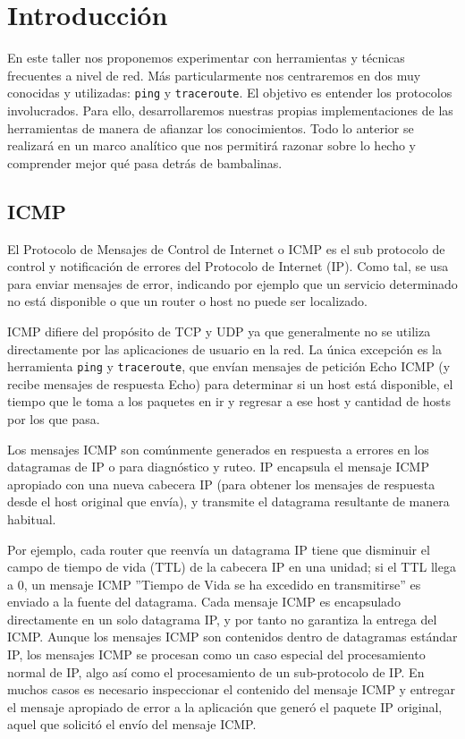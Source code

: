 \section{Introducción}

En este taller nos proponemos experimentar con herramientas y técnicas frecuentes a nivel de red. Más particularmente nos centraremos en dos muy conocidas y utilizadas: \texttt{ping} y \texttt{traceroute}. El objetivo es entender los protocolos involucrados. Para ello, desarrollaremos nuestras propias implementaciones de las herramientas de manera de afianzar los conocimientos. Todo lo anterior se realizará en un marco analítico que nos permitirá razonar sobre lo hecho y comprender mejor qué pasa detrás de bambalinas.

\subsection{ICMP}

El Protocolo de Mensajes de Control de Internet o ICMP es el sub protocolo de control y notificación de errores del Protocolo de Internet (IP). Como tal, se usa para enviar mensajes de error, indicando por ejemplo que un servicio determinado no está disponible o que un router o host no puede ser localizado.

ICMP difiere del propósito de TCP y UDP ya que generalmente no se utiliza directamente por las aplicaciones de usuario en la red. La única excepción es la herramienta \texttt{ping} y \texttt{traceroute}, que envían mensajes de petición Echo ICMP (y recibe mensajes de respuesta Echo) para determinar si un host está disponible, el tiempo que le toma a los paquetes en ir y regresar a ese host y cantidad de hosts por los que pasa.

\vspace*{5 mm}

Los mensajes ICMP son comúnmente generados en respuesta a errores en los datagramas de IP o para diagnóstico y ruteo. IP encapsula el mensaje ICMP apropiado con una nueva cabecera IP (para obtener los mensajes de respuesta desde el host original que envía), y transmite el datagrama resultante de manera habitual.

Por ejemplo, cada router que reenvía un datagrama IP tiene que disminuir el campo de tiempo de vida (TTL) de la cabecera IP en una unidad; si el TTL llega a 0, un mensaje ICMP ''Tiempo de Vida se ha excedido en transmitirse'' es enviado a la fuente del datagrama. Cada mensaje ICMP es encapsulado directamente en un solo datagrama IP, y por tanto no garantiza la entrega del ICMP. Aunque los mensajes ICMP son contenidos dentro de datagramas estándar IP, los mensajes ICMP se procesan como un caso especial del procesamiento normal de IP, algo así como el procesamiento de un sub-protocolo de IP. En muchos casos es necesario inspeccionar el contenido del mensaje ICMP y entregar el mensaje apropiado de error a la aplicación que generó el paquete IP original, aquel que solicitó el envío del mensaje ICMP.

